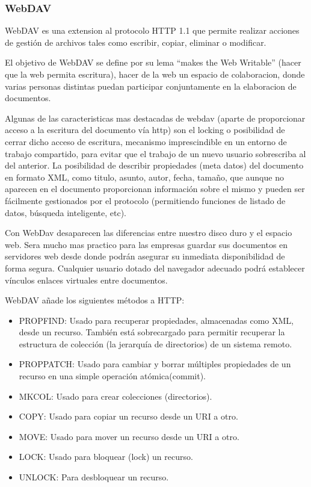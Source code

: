 \subsubsection*{WebDAV}

WebDAV es una extension al protocolo HTTP 1.1 que permite realizar acciones de gestión de archivos tales como escribir, copiar, eliminar o modificar.

El objetivo de WebDAV se define por su lema ``makes the Web Writable'' (hacer que la web permita escritura), hacer de la web un espacio de colaboracion, donde varias personas distintas puedan participar conjuntamente en la elaboracion de documentos.

Algunas de las caracteristicas mas destacadas de webdav (aparte de proporcionar acceso a la escritura del documento vía http) son el locking o posibilidad de cerrar dicho acceso de escritura, mecanismo imprescindible en un entorno de trabajo compartido, para evitar que el trabajo de un nuevo usuario sobrescriba al del anterior. La posibilidad de describir propiedades (meta datos) del documento en formato XML, como titulo, asunto, autor, fecha, tamaño, que aunque no aparecen en el documento proporcionan información sobre el mismo y pueden ser fácilmente gestionados por el protocolo (permitiendo funciones de listado de datos, búsqueda inteligente, etc).

Con WebDav desaparecen las diferencias entre nuestro disco duro y el espacio web. Sera mucho mas practico para las empresas guardar sus documentos en servidores web desde donde podrán asegurar su inmediata disponibilidad de forma segura. Cualquier usuario dotado del navegador adecuado podrá establecer vínculos enlaces virtuales entre documentos.

WebDAV añade los siguientes métodos a HTTP:

\begin{itemize}

	\item PROPFIND: Usado para recuperar propiedades, almacenadas como XML, desde un recurso. También está sobrecargado para permitir recuperar la estructura de colección (la jerarquía de directorios) de un sistema remoto.
	
	\item PROPPATCH: Usado para cambiar y borrar múltiples propiedades de un recurso en una simple operación atómica(commit).
	
	\item MKCOL: Usado para crear colecciones (directorios).
	
	\item COPY: Usado para copiar un recurso desde un URI a otro.
	
	\item MOVE: Usado para mover un recurso desde un URI a otro.
	
	\item LOCK: Usado para bloquear (lock) un recurso.
	
	\item UNLOCK: Para desbloquear un recurso.

\end{itemize}

